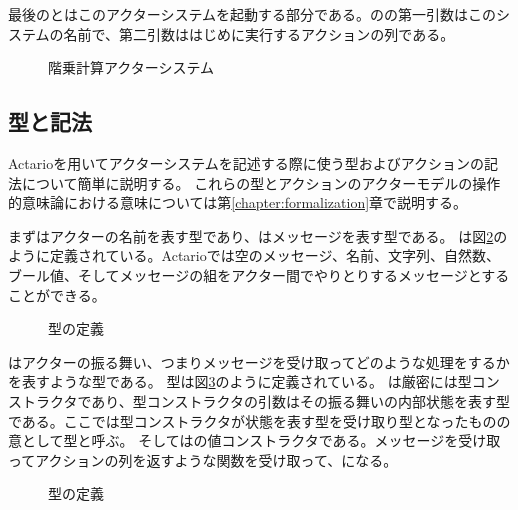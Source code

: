 最後のとはこのアクターシステムを起動する部分である。のの第一引数はこのシステムの名前で、第二引数ははじめに実行するアクションの列である。

\begin{figure}[tp]
  
  \label{code:overview:fact-impl}
  \caption{階乗計算アクターシステム}
\end{figure}

\subsection{型と記法}

Actarioを用いてアクターシステムを記述する際に使う型およびアクションの記法について簡単に説明する。
これらの型とアクションのアクターモデルの操作的意味論における意味については第\ref{chapter:formalization}章で説明する。

まずはアクターの名前を表す型であり、はメッセージを表す型である。
は図\ref{code:overview:message}のように定義されている。Actarioでは空のメッセージ、名前、文字列、自然数、ブール値、そしてメッセージの組をアクター間でやりとりするメッセージとすることができる。

\begin{figure}
  
  \label{code:overview:message}
  \caption{型の定義}
\end{figure}

はアクターの振る舞い、つまりメッセージを受け取ってどのような処理をするかを表すような型である。
型は図\ref{code:overview:behavior}のように定義されている。
は厳密には型コンストラクタであり、型コンストラクタの引数はその振る舞いの内部状態を表す型である。ここでは型コンストラクタが状態を表す型を受け取り型となったものの意として型と呼ぶ。
そしてはの値コンストラクタである。メッセージを受け取ってアクションの列を返すような関数を受け取って、になる。

\begin{figure}
  
  \label{code:overview:behavior}
  \caption{型の定義}
\end{figure}

